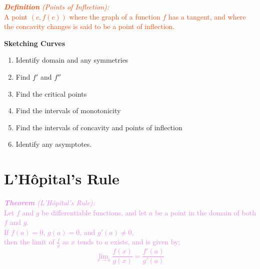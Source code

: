 \documentclass{report}
\newenvironment{definition}[1][OrangeRed]
  {\begin{tcolorbox}[colframe=#1,colback=white]}
  {\end{tcolorbox}}
\newenvironment{theorem}[1][Violet]
  {\begin{tcolorbox}[colframe=#1,colback=white]}
  {\end{tcolorbox}}
\newenvironment{information}[1][Cerulean]
  {\begin{tcolorbox}[colframe=#1,colback=white]}
  {\end{tcolorbox}}
\begin{document}
\begin{definition}
    \textcolor{OrangeRed}{\textit{\textbf{Definition} (Points of Inflection):}\\
    A point $(c, f(c))$ where the graph of a function $f$ has a tangent, and where the concavity changes is said to be a point of inflection.}
\end{definition}

\begin{information}
\textcolor{Cerulean}{
    \begin{center}
        \textbf{Sketching Curves}\\
    \end{center}
    \begin{enumerate}
        \item Identify domain and any symmetries
        \item Find $f'$ and $f''$
        \item Find the critical points
        \item Find the intervals of monotonicity
        \item Find the intervals of concavity and points of inflection
        \item Identify any asymptotes.
    \end{enumerate}}
\end{information}

\section{L'Hôpital's Rule}

\begin{theorem}
    \textcolor{Violet}{\textit{\textbf{Theorem} (L'Hôpital's Rule):}\\
    Let $f$ and $g$ be differentiable functions, and let $a$ be a point in the domain of both $f$ and $g$.\\
    If $f(a) = 0$, $g(a) = 0$, and $g'(a) \neq 0$,\\
    then the limit of $\frac{f}{g}$ as $x$ tends to $a$ exists, and is given by;
    \begin{equation}
    \lim_{x \longrightarrow a} \frac{f(x)}{g(x)} = \frac{f'(a)}{g'(a)}
    \end{equation}}
\end{theorem}
\end{document}
